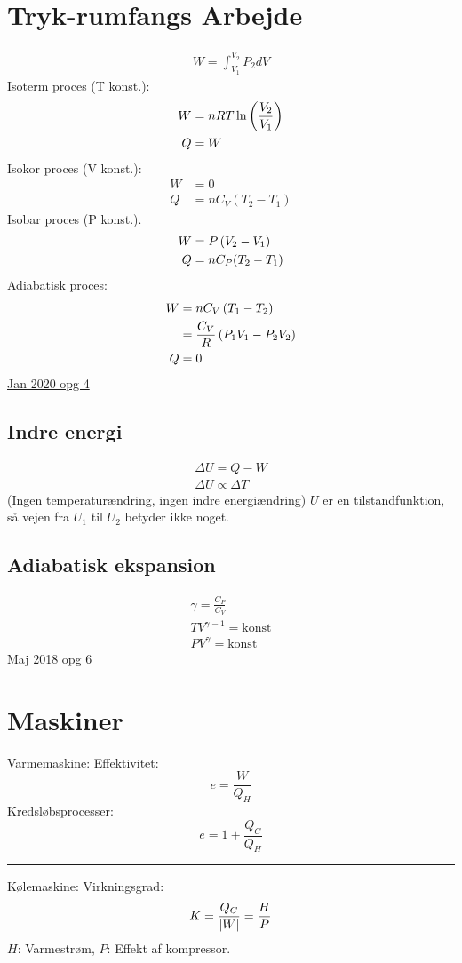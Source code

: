 \documentclass[a4paper,oneside,article]{memoir}
\begin{document}
\section{Tryk-rumfangs Arbejde} \label{sc:arbejdeidealgas}
\begin{align*}
    W = \int_{V_1}^{V_2}P_2dV
\end{align*}
Isoterm proces (T konst.): 
\begin{align*}
    W &= nRT\ln\br{\frac{V_2}{V_1}} \\
    Q &= W
\end{align*}
Isokor proces (V konst.): 
\begin{align*}
    W&=0 \\
    Q &= nC_V(T_2-T_1)
\end{align*}
Isobar proces (P konst.). 
\begin{align*}
    W &= P\br{V_2-V_1} \\
    Q &= nC_P(T_2-T_1)
\end{align*}
Adiabatisk proces: 
\begin{align*}
    W &= nC_V\br{T_1-T_2} \\
    &= \frac{C_V}{R}\br{P_1V_1-P_2V_2} \\
    Q &= 0
\end{align*}
\hyperref[asc:Jan 2020 opg 4]{Jan 2020 opg 4}

\subsection{Indre energi} \label{ssc:indreenergi}
\begin{align*}
    \Delta U = Q-W \\
    \Delta U \propto \Delta T
\end{align*}
(Ingen temperaturændring, ingen indre energiændring) 
$U$ er en tilstandfunktion, så vejen fra $U_1$ til $U_2$ betyder ikke noget. 

\subsection{Adiabatisk ekspansion} \label{ssc:adiabatisk}
\begin{align*}
    \gamma = \frac{C_P}{C_V} \\
    TV^{\gamma-1} = \text{konst} \\
    PV^\gamma = \text{konst}
\end{align*}
\hyperref[asc:Maj 2018 opg 6]{Maj 2018 opg 6}

\section{Maskiner} \label{sc:maskiner}
Varmemaskine: 
Effektivitet: \[e=\frac{W}{Q_H}\]
Kredsløbsprocesser: \[e = 1+\frac{Q_C}{Q_H}\]
\plainbreak{1}
Kølemaskine: 
Virkningsgrad: \[K = \frac{Q_C}{\br[5]{W}}=\frac{H}{P}\]
$H$: Varmestrøm, $P$: Effekt af kompressor. 
\end{document}
